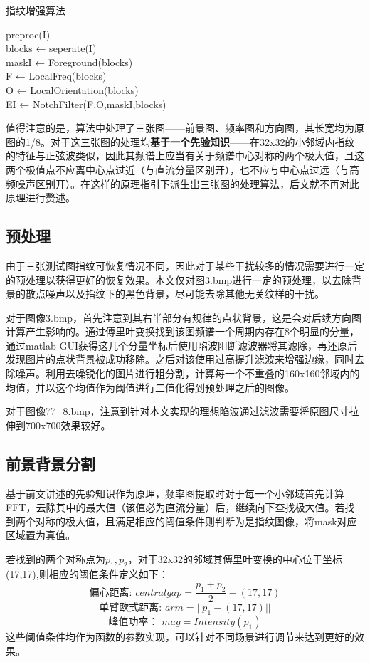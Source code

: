 \documentclass[UTF8]{ctexart}
\begin{document}
\begin{algorithm}[H]
    \caption{指纹增强算法}
    {
        preproc(I)\\
        blocks ← seperate(I)\\
        maskI ← Foreground(blocks)\\
        F ← LocalFreq(blocks)\\
        O ← LocalOrientation(blocks)\\
        EI ← NotchFilter(F,O,maskI,blocks)
    }
\end{algorithm}
值得注意的是，算法中处理了三张图——前景图、频率图和方向图，其长宽均为原图的1/8。对于这三张图的处理均\textbf{基于一个先验知识}——在32x32的小邻域内指纹的特征与正弦波类似，因此其频谱上应当有关于频谱中心对称的两个极大值，且这两个极值点不应离中心点过近（与直流分量区别开），也不应与中心点过远（与高频噪声区别开）。在这样的原理指引下派生出三张图的处理算法，后文就不再对此原理进行赘述。

\subsection{预处理}
由于三张测试图指纹可恢复情况不同，因此对于某些干扰较多的情况需要进行一定的预处理以获得更好的恢复效果。本文仅对图3.bmp进行一定的预处理，以去除背景的散点噪声以及指纹下的黑色背景，尽可能去除其他无关纹样的干扰。

对于图像3.bmp，首先注意到其右半部分有规律的点状背景，这是会对后续方向图计算产生影响的。通过傅里叶变换找到该图频谱一个周期内存在8个明显的分量，通过matlab GUI获得这几个分量坐标后使用陷波阻断滤波器将其滤除，再还原后发现图片的点状背景被成功移除。之后对该使用过高提升滤波来增强边缘，同时去除噪声。利用去噪锐化的图片进行粗分割，计算每一个不重叠的160x160邻域内的均值，并以这个均值作为阈值进行二值化得到预处理之后的图像。

对于图像77\_8.bmp，注意到针对本文实现的理想陷波通过滤波需要将原图尺寸拉伸到700x700效果较好。

\subsection{前景背景分割}

基于前文讲述的先验知识作为原理，频率图提取时对于每一个小邻域首先计算FFT，去除其中的最大值（该值必为直流分量）后，继续向下查找极大值。若找到两个对称的极大值，且满足相应的阈值条件则判断为是指纹图像，将mask对应区域置为真值。

若找到的两个对称点为$p_1,p_2$，对于32x32的邻域其傅里叶变换的中心位于坐标(17,17),则相应的阈值条件定义如下：
$$\text{偏心距离: } centralgap = \frac{p_1+p_2}{2}-(17,17)$$
$$\text{单臂欧式距离: } arm = ||p_1-(17,17)||$$
$$\text{峰值功率： } mag = Intensity(p_1)$$
这些阈值条件均作为函数的参数实现，可以针对不同场景进行调节来达到更好的效果。
\end{document}
